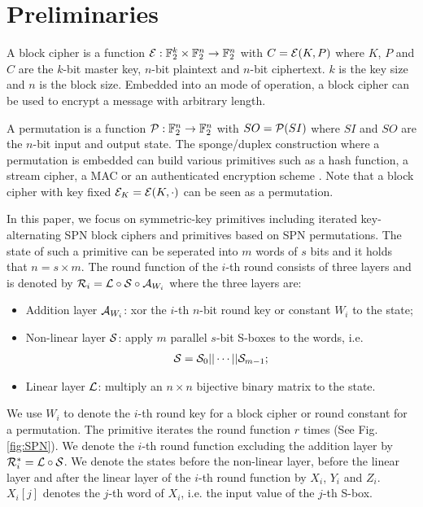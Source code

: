\section{Preliminaries}\label{sec:pre}

A block cipher is a function $\mathcal{E}:\mathbb{F}_2^k \times \mathbb{F}_2^n \rightarrow \mathbb{F}_2^n$ with $C=\mathcal{E}(K,P)$ where $K$, $P$ and $C$ are the $k$-bit master key, $n$-bit plaintext and $n$-bit ciphertext. $k$ is the key size and $n$ is the block size. Embedded into an mode of operation, a block cipher can be used to encrypt a message with arbitrary length. 

A permutation is a function $\mathcal{P}:\mathbb{F}_2^n \rightarrow \mathbb{F}_2^n$ with $SO=\mathcal{P}(SI)$ where $SI$ and $SO$ are the $n$-bit input and output state. The sponge/duplex construction where a permutation is embedded can build various primitives such as a hash function, a stream cipher, a MAC or an authenticated encryption scheme \cite{bertoni2007sponge}. Note that a block cipher with key fixed $\mathcal{E}_K=\mathcal{E}(K,\cdot)$ can be seen as a permutation.

In this paper, we focus on symmetric-key primitives including iterated key-alternating SPN block ciphers and primitives based on SPN permutations. The state of such a primitive can be seperated into $m$ words of $s$ bits and it holds that $n=s\times m$. The round function of the $i$-th round consists of three layers and is denoted by $\mathcal{R}_i=\mathcal{L}\circ\mathcal{S}\circ\mathcal{A}_{W_i}$ where the three layers are:
\begin{itemize}
    \item Addition layer $\mathcal{A}_{W_i}$: xor the $i$-th $n$-bit round key or constant $W_i$ to the state;
    \item Non-linear layer $\mathcal{S}$: apply $m$ parallel $s$-bit S-boxes to the words, i.e.
    \begin{align*}
        \mathcal{S}=\mathcal{S}_0||\cdots||\mathcal{S}_{m-1};
    \end{align*}
    \item Linear layer $\mathcal{L}$: multiply an $n\times n$ bijective binary matrix to the state. 
\end{itemize}

We use $W_i$ to denote the $i$-th round key for a block cipher or round constant for a permutation. The primitive iterates the round function $r$ times (See Fig. \ref{fig:SPN}). We denote the $i$-th round function excluding the addition layer by $\mathcal{R}_i^*=\mathcal{L}\circ\mathcal{S}$. We denote the states before the non-linear layer, before the linear layer and after the linear layer of the $i$-th round function by $X_i$, $Y_i$ and $Z_i$. $X_i[j]$ denotes the $j$-th word of $X_i$, i.e. the input value of the $j$-th S-box. %

